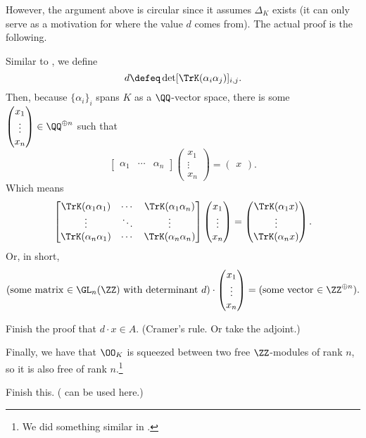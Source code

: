 However, the argument above is circular since it assumes $\Delta_K$ exists (it can only serve as a
motivation for where the value $d$ comes from).
The actual proof is the following.

Similar to , we define
\[ d \defeq \det [\TrK(\alpha_i \alpha_j)]_{i, j}. \]
Then, because $\{ \alpha_i \}_{i}$ spans $K$ as a $\QQ$-vector space,
there is some $\begin{pmatrix} x_1 \\ \vdots \\ x_n \end{pmatrix} \in \QQ^{\oplus n}$ such that
\[ \begin{bmatrix} \alpha_1 & \cdots & \alpha_n \end{bmatrix}
\begin{pmatrix} x_1 \\ \vdots \\ x_n \end{pmatrix}
= \begin{pmatrix} x \end{pmatrix}. \]
Which means
\[ \begin{bmatrix}
	\TrK(\alpha_1 \alpha_1) & \cdots & \TrK(\alpha_1 \alpha_n) \\
	\vdots & \ddots & \vdots \\
	\TrK(\alpha_n \alpha_1) & \cdots & \TrK(\alpha_n \alpha_n)
\end{bmatrix}
\begin{pmatrix} x_1 \\ \vdots \\ x_n \end{pmatrix}
= \begin{pmatrix} \TrK(\alpha_1 x) \\ \vdots \\ \TrK(\alpha_n x) \end{pmatrix}. \]
Or, in short,
\[
	(\text{some matrix $\in \GL_n(\ZZ)$ with determinant $d$}) \cdot
	\begin{pmatrix} x_1 \\ \vdots \\ x_n \end{pmatrix}
	= (\text{some vector $\in \ZZ^{\oplus n}$}).
\]
\begin{ques}
	Finish the proof that $d \cdot x \in A$.
	(Cramer's rule. Or take the adjoint.)
\end{ques}

Finally, we have that $\OO_K$ is squeezed between two free $\ZZ$-modules of rank $n$, so it is
also free of rank $n$.\footnote{We did something similar in .}
\begin{ques}
	Finish this. ( can be used here.)
\end{ques}

